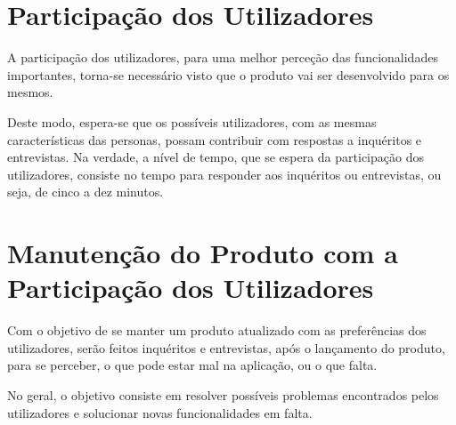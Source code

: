\section{Participação dos Utilizadores}

\hspace{5mm} A participação dos utilizadores, para uma melhor perceção das funcionalidades importantes, torna-se necessário visto que o produto vai ser desenvolvido para os mesmos. 

\hspace{5mm} Deste modo, espera-se que os possíveis utilizadores, com as mesmas características das personas, possam contribuir com respostas a inquéritos e entrevistas. Na verdade, a nível de tempo, que se espera da participação dos utilizadores, consiste no tempo para responder aos inquéritos ou entrevistas, ou seja, de cinco a dez minutos.  

\section{Manutenção do Produto com a Participação dos Utilizadores}
\hspace{5mm} Com o objetivo de se manter um produto atualizado com as preferências dos utilizadores, serão feitos inquéritos e entrevistas, após o lançamento do produto, para se perceber, o que pode estar mal na aplicação, ou o que falta.

\hspace{5mm} No geral, o objetivo consiste em resolver possíveis problemas encontrados pelos utilizadores e solucionar novas funcionalidades em falta.
